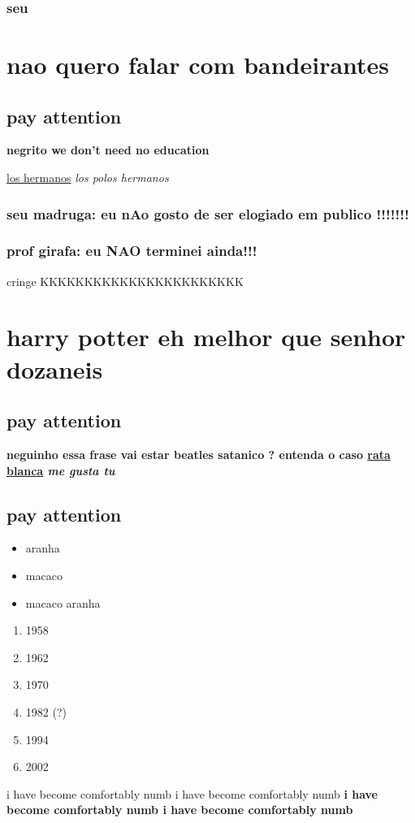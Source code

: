 \documentclass[12pt]{article}
\begin{document}
	\subsection{seu}
	\chapter{nao quero falar com bandeirantes}
	\section{pay attention}
	\bf{negrito} we don't need no education\par 
	\underline{los hermanos} \it{los polos hermanos}\par
	\subsection{seu madruga: eu nAo gosto de ser elogiado em publico !!!!!!!}
	\subsection{prof girafa: eu NAO terminei ainda!!!}
	cringe KKKKKKKKKKKKKKKKKKKKKKK\par
	\chapter{harry potter eh melhor que senhor dozaneis}
	\section{pay attention}
	\bf{neguinho essa frase vai estar} beatles satanico ? entenda o caso 
	\underline{rata blanca} \it{me gusta tu}\par
	\section{pay attention}
	\begin{itemize} 
	\item aranha 
	\item macaco
	\item macaco aranha
	\end{itemize}
	\begin{enumerate} 
	\item 1958
	\item 1962
	\item 1970
	\item 1982 (?)
	\item 1994
	\item 2002
	\end{enumerate}
	i have become comfortably numb
	i have become comfortably numb \bf{i have become comfortably numb}
	i have become comfortably numb \par
\end{document}
